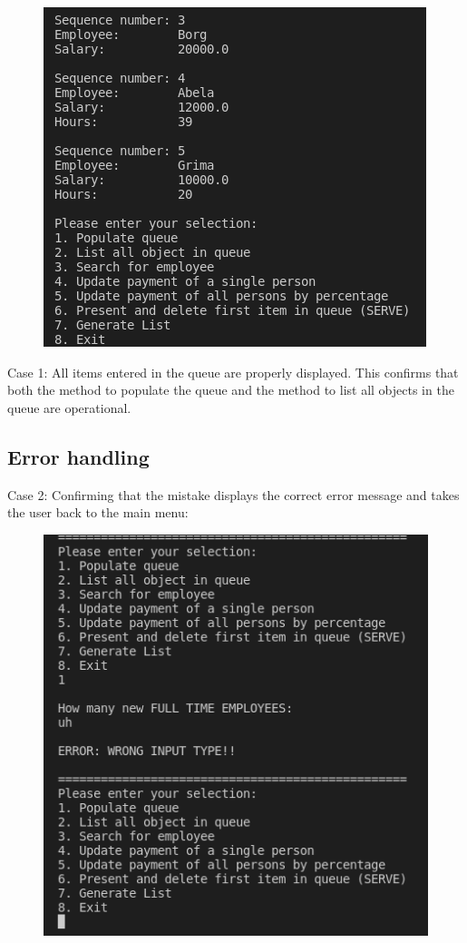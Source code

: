 \documentclass[12pt]{article}
\begin{document}
\begin{figure}[h]
\centering
\includegraphics[scale=0.30]{Images/Testing 1/2.png}
\end{figure}

Case 1: All items entered in the queue are properly displayed. This confirms that both the method to populate the queue and the method to list all objects in the queue are operational.
\subsection{Error handling}
Case 2: Confirming that the mistake displays the correct error message and takes the user back to the main menu:
\begin{figure}[h]
\centering
\includegraphics[scale=0.30]{Images/Testing 2/1.png}
\end{figure}
\end{document}
